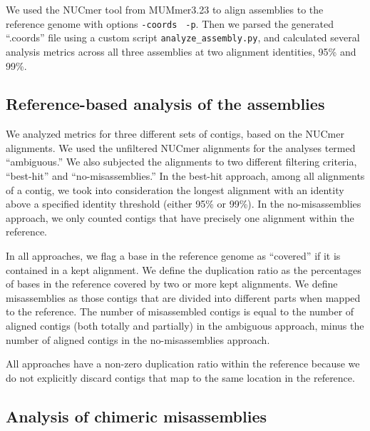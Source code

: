 \documentclass[11pt]{article}
\begin{document}
We used the NUCmer tool from MUMmer3.23 \cite{mummer3.0} to align
assemblies to the reference genome with options {\tt \--coords} {\tt
  -p}. Then we parsed the generated ``.coords'' file using a custom
script {\tt{analyze\_assembly.py}}, and calculated several analysis
metrics across all three assemblies at two alignment identities, 95\% and 99\%.

\subsection*{Reference-based analysis of the assemblies}

We analyzed metrics for three different sets of contigs, based on the
NUCmer alignments.  We used the unfiltered NUCmer alignments for the
analyses termed ``ambiguous.''  We also subjected the alignments to
two different filtering criteria, ``best-hit'' and
``no-misassemblies.''
In the best-hit approach, among all alignments of a contig, we took
into consideration the longest alignment with an identity above a specified
identity threshold (either 95\% or 99\%).
In the no-misassemblies approach, we only counted contigs that have
precisely one alignment within the reference.

In all approaches, we flag a base in the reference genome as
``covered'' if it is contained in a kept alignment.  We define the
duplication ratio as the percentages of bases in the reference covered
by two or more kept alignments. We define misassemblies as
those contigs that are divided into different parts when mapped to the
reference.  The number of misassembled contigs is equal to the number
of aligned contigs (both totally and partially) in the ambiguous
approach, minus the number of aligned contigs in the no-misassemblies
approach.


All approaches have a non-zero duplication ratio within the reference
because we do not explicitly discard contigs that map to the same
location in the reference.

\subsection*{Analysis of chimeric misassemblies}
\end{document}
